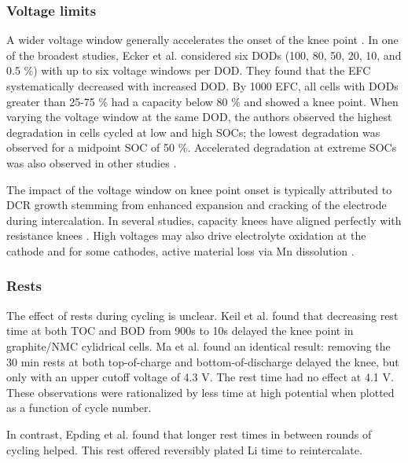 \documentclass{article}
\begin{document}
\subsubsection{Voltage limits} 
A wider voltage window generally accelerates the onset of the knee point \cite{ecker_calendar_2014, pfrang_long-term_2018, klett_non-uniform_2014, ma_novel_2019, petzl_lithium_2015, schuster_nonlinear_2015}. In one of the broadest studies, Ecker et al. \cite{ecker_calendar_2014} considered six DODs (100, 80, 50, 20, 10, and 0.5 \%) with up to six voltage windows per DOD. They found that the EFC systematically decreased with increased DOD. By 1000 EFC, all cells with DODs greater than 25-75 \% had a capacity below 80 \% and showed a knee point. When varying the voltage window at the same DOD, the authors observed the highest degradation in cells cycled at low and high SOCs; the lowest degradation was observed for a midpoint SOC of 50 \%. Accelerated degradation at extreme SOCs was also observed in other studies \cite{aiken_accelerated_2020,ma_novel_2019, zhu_investigation_2021}.

The impact of the voltage window on knee point onset is typically attributed to DCR growth stemming from enhanced expansion and cracking of the electrode during intercalation. In several studies, capacity knees have aligned perfectly with resistance knees \cite{ecker_calendar_2014, klett_non-uniform_2014, schuster_nonlinear_2015, zhu_investigation_2021}. High voltages may also drive electrolyte oxidation at the cathode \cite{aiken_accelerated_2020} and for some cathodes, active material loss via Mn dissolution \cite{ma_novel_2019}. 



\subsubsection{Rests}

The effect of rests during cycling is unclear. 
Keil et al.\cite{keil_linear_2019} found that decreasing rest time at both TOC and BOD from 900s to 10s delayed the knee point in graphite/NMC cylidrical cells.
Ma et al.\cite{ma_editors_2019} found an identical result: removing the 30 min rests at both top-of-charge and bottom-of-discharge delayed the knee, but only with an upper cutoff voltage of 4.3 V. The rest time had no effect at 4.1 V.
These observations were rationalized by less time at high potential when plotted as a function of cycle number.

In contrast, Epding et al.\cite{epding_investigation_2019} found that longer rest times in between rounds of cycling helped. This rest offered reversibly plated Li time to reintercalate.
\end{document}
